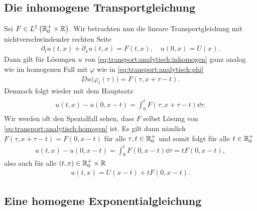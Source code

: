 \subsection*{Die inhomogene Transportgleichung}
Sei $F \in L^1\left( \mathbb R^+_0 \times \mathbb R \right)$. Wir betrachten nun die lineare Transportgleichung mit nichtverschwindender rechten Seite
\begin{align}\label{eq:transport:analytisch:inhomogen}
\partial_t u(t,x) + \partial_x u(t,x) = F(t,x), \quad u(0, x) = U(x).
\end{align}
Dann gilt für Lösungen $u$ von \eqref{eq:transport:analytisch:inhomogen} ganz analog wie im homogenen Fall mit $\varphi$ wie in \eqref{eq:transport:analytisch:phi}
\begin{align}
D u\bigl(\varphi_t(\tau)\bigr) = F(\tau,x + \tau - t).
\end{align}
Demnach folgt wieder mit dem Hauptsatz
\begin{align} \label{eq:transport:analytisch:inhomogen:loesung:allgemein}
\begin{split}
u( t, x ) - u( 0, x -t ) = \int_0^t F(\tau, x + \tau - t) \dd \tau.
\end{split}
\end{align}
Wir werden oft den Spezialfall sehen, dass $F$ selbst Lösung von \eqref{eq:transport:analytisch:homogen} ist.
Es gilt dann nämlich $F(\tau, x + \tau - t) = F(0, x-t)$ für alle $\tau,t \in \mathbb R^+_0$ und somit folgt für alle $t \in \mathbb R^+_0$
\begin{align} 
u( t, x ) - u( 0, x -t ) = \int_0^t F(0, x - t) \dd \tau = t F(0,x-t),
\end{align}
also auch für alle $(t, x) \in \mathbb R^+_0 \times \mathbb R$
\begin{align}\label{eq:transport:analytisch:inhomogen:loesung:spezial}u(t,x) = U(x - t) + t F(0, x-t).\end{align}

\subsection*{Eine homogene Exponentialgleichung}

